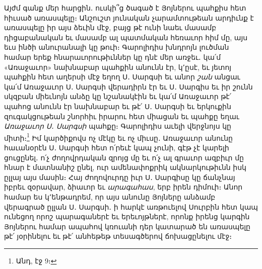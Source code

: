 \documentclass{article}
\begin{document}
{Այժմ գանք մեր հարցին․ ուսկի՞ց ծագած է Յոյներու պահքիս հետ հիւսած առասպելը։ Անշուշտ յունական չարամտութեան արդիւնք է առասպելը իր այս ձեւին մէջ, բայց թէ ունի նաեւ մասամբ դիցաբանական եւ մասամբ ալ պատմական հեռաւոր հիմ մը, այս եւս ինծի անուրանալի կը թուի։ Գարոլիդիս խնդրոյն լուծման համար երեք հնարաւորութիւններ կը դնէ մեր առջեւ․ կա՛մ «Առաջաւոր» նախնաբար պահքին անունն էր, կ՚ըսէ, եւ յետոյ պահքին հետ աղերսի մէջ եղող Ս․ Սարգսի եւ անոր \emph{շան} անցաւ կա՛մ Առաջաւոր Ս․ Սարգսի վերադիրն էր եւ Ս․ Սարգիս եւ իր շունն սկզբան միեւնոյն անձը կը նշանակէին եւ կա՛մ Առաջաւոր թէ՛ պահոց անունն էր նախնաբար եւ թէ՛ Ս․ Սարգսի եւ երկուքին զուգակցութեան շնորհիւ իրարու հետ միացան եւ պահքը եղաւ \emph{Առաջաւոր Ս․ Սարգսի} պահքը։ Գարոլիդիս աւելի վերջնոյս կը միտի։\footnote{Անդ, էջ 9։} Իմ կարծիքովս ոչ մէկը եւ ոչ միւսը․ Առաջաւոր անունը հաւանօրէն Ս․ Սարգսի հետ ո՛րեւէ կապ չունի, գէթ չէ կարելի ցուցընել․ ո՛չ ժողովրդական զրոյց մը եւ ո՛չ ալ գրաւոր ազբիւր մը հնար է մատնանիշ ընել, ուր ամենափոքրիկ ակնարկութիւնն իսկ ըլլայ այս մասին։ Հայ ժողովուրդը իւր Ս․ Սարգիսը կը ճանչնայ իբրեւ զօրավար, ձիաւոր եւ \emph{արագահաս}, երբ իրեն դիմուի։ Անոր համար ես կ՚ենթադրեմ, որ այս անունը Յոյները անձամբ վերագրած ըլլան Ս․ Սարգսի․ ի հարկէ առթուելով Սուրբին հետ կապ ունեցող որոշ պարագաներէ եւ երեւոյթներէ, որոնք իրենց կարգին Յոյներու համար ապահով կռուանի դեր կատարած են առասպելը թէ՛ յօրինելու եւ թէ՛ անհեթեթ տեսագծերով ճոխացընելու մէջ։

}
\end{document}
